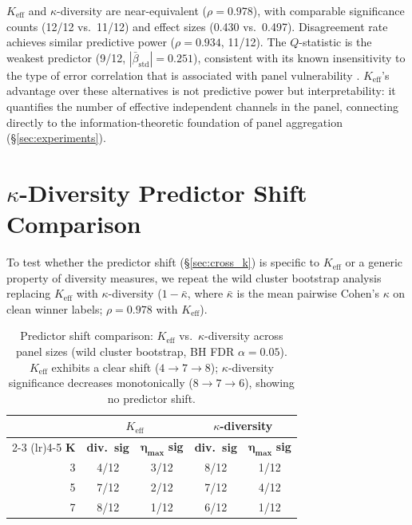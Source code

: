 $K_{\mathrm{eff}}$ and $\kappa$-diversity \citep{kuncheva2003measures} are near-equivalent ($\rho{=}0.978$), with comparable significance counts (12/12 vs.\ 11/12) and effect sizes (0.430 vs.\ 0.497). Disagreement rate achieves similar predictive power ($\rho{=}0.934$, 11/12). The $Q$-statistic is the weakest predictor (9/12, $|\bar{\beta}_{\mathrm{std}}|{=}0.251$), consistent with its known insensitivity to the type of error correlation that is associated with panel vulnerability \citep{kuncheva2003measures}. $K_{\mathrm{eff}}$'s advantage over these alternatives is not predictive power but interpretability: it quantifies the number of effective independent channels in the panel, connecting directly to the information-theoretic foundation of panel aggregation (\S\ref{sec:experiments}).

\section{$\kappa$-Diversity Predictor Shift Comparison}
\label{app:kappa_regime}

To test whether the predictor shift (\S\ref{sec:cross_k}) is specific to $K_{\mathrm{eff}}$ or a generic property of diversity measures, we repeat the wild cluster bootstrap analysis replacing $K_{\mathrm{eff}}$ with $\kappa$-diversity ($1 - \bar{\kappa}$, where $\bar{\kappa}$ is the mean pairwise Cohen's $\kappa$ on clean winner labels; $\rho{=}0.978$ with $K_{\mathrm{eff}}$).

\begin{table}[h]
\centering
\small
\begin{tabular}{rcccc}
\toprule
& \multicolumn{2}{c}{\textbf{$K_{\mathrm{eff}}$}} & \multicolumn{2}{c}{\textbf{$\kappa$-diversity}} \\
\cmidrule(lr){2-3} \cmidrule(lr){4-5}
$\boldsymbol{K}$ & \textbf{div.\ sig} & $\boldsymbol{\eta_{\max}}$ \textbf{sig} & \textbf{div.\ sig} & $\boldsymbol{\eta_{\max}}$ \textbf{sig} \\
\midrule
3 & 4/12  & 3/12 & 8/12 & 1/12 \\
5 & 7/12 & 2/12 & 7/12 & 4/12 \\
7 & 8/12  & 1/12 & 6/12 & 1/12 \\
\bottomrule
\end{tabular}
\caption{Predictor shift comparison: $K_{\mathrm{eff}}$ vs.\ $\kappa$-diversity across panel sizes (wild cluster bootstrap, BH FDR $\alpha{=}0.05$). $K_{\mathrm{eff}}$ exhibits a clear shift ($4 \to 7 \to 8$); $\kappa$-diversity significance decreases monotonically ($8 \to 7 \to 6$), showing no predictor shift.}
\label{tab:kappa_regime}
\end{table}

